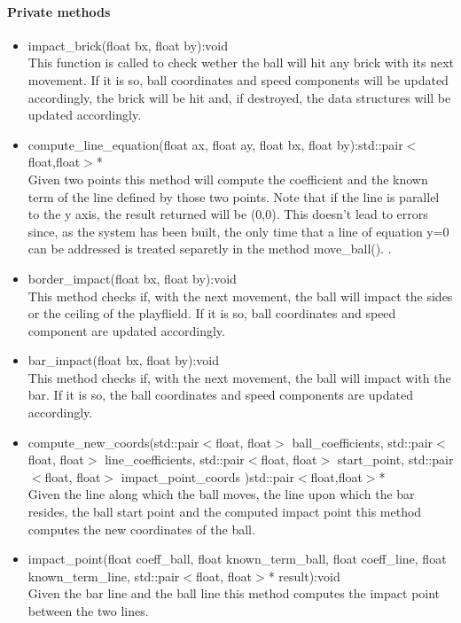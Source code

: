 \documentclass[]{article}
\begin{document}
	\paragraph{Private methods}
	\begin{itemize}
	\item impact\_brick(float bx, float by):void\\ This function is called to check wether the ball will hit any brick with its next movement. If it is so, ball coordinates and speed components will be updated accordingly, the brick will be hit and, if destroyed, the data structures will be updated accordingly.
	\item compute\_line\_equation(float ax, float ay, float bx, float by):std::pair$<$float,float$>$*\\Given two points this method will compute the coefficient and the known term of the line defined by those two points. Note that if the line is parallel to the y axis, the result returned will be (0,0). This doesn't lead to errors since, as the system has been built, the only time that a line of equation y=0 can be addressed is treated separetly in the method move\_ball(). .
	\item border\_impact(float bx, float by):void \\This method checks if, with the next movement, the ball will impact the sides or the ceiling of the playflield. If it is so, ball coordinates and speed component are updated accordingly.
	\item bar\_impact(float bx, float by):void \\This method checks if, with the next movement, the ball will impact with the bar. If it is so, the ball coordinates and speed components are updated accordingly.
	\item compute\_new\_coords(std::pair$<$float, float$>$ ball\_coefficients, std::pair$<$float, float$>$ line\_coefficients, std::pair$<$float, float$>$ start\_point, std::pair$<$float, float$>$ impact\_point\_coords )std::pair$<$float,float$>$*\\Given the line along which the ball moves, the line upon which the bar resides, the ball start point and the computed impact point this method computes the new coordinates of the ball.
	\item impact\_point(float coeff\_ball, float known\_term\_ball, float coeff\_line, float known\_term\_line, std::pair$<$float, float$>$* result):void \\Given the bar line and the ball line this method computes the impact point between the two lines.

\end{itemize}
\end{document}
